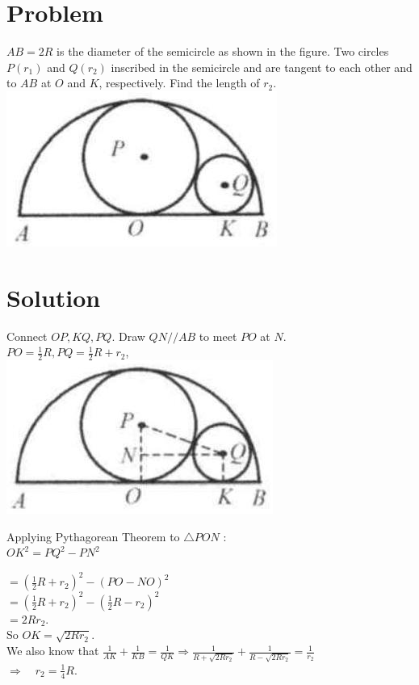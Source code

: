 \documentclass{article}
\begin{document}
\section*{Problem}
\(A B=2 R\) is the diameter of the semicircle as shown in the figure. Two circles \(P\left(r_{1}\right)\) and \(Q\left(r_{2}\right)\) inscribed in the semicircle and are tangent to each other and to \(A B\) at \(O\) and \(K\), respectively. Find the length of \(r_{2}\).\\
\centering
\includegraphics[width=\textwidth]{images/185(2).jpg}

\section*{Solution}
Connect \(O P, K Q, P Q\). Draw \(Q N / / A B\) to meet \(P O\) at \(N\).\\
\(P O=\frac{1}{2} R, P Q=\frac{1}{2} R+r_{2}\),\\
\centering
\includegraphics[width=\textwidth]{images/188.jpg}

Applying Pythagorean Theorem to \(\triangle P O N\) :\\
\(O K^{2}=P Q^{2}-P N^{2}\)


\(=\left(\frac{1}{2} R+r_{2}\right)^{2}-(P O-N O)^{2}\)\\
\(=\left(\frac{1}{2} R+r_{2}\right)^{2}-\left(\frac{1}{2} R-r_{2}\right)^{2}\)\\
\(=2 R r_{2}\).\\
So \(O K=\sqrt{2 R r_{2}}\).\\
We also know that \(\frac{1}{A K}+\frac{1}{K B}=\frac{1}{Q K} \Rightarrow \frac{1}{R+\sqrt{2 R r_{2}}}+\frac{1}{R-\sqrt{2 R r_{2}}}=\frac{1}{r_{2}}\)\\
\(\Rightarrow \quad r_{2}=\frac{1}{4} R\).
\end{document}
